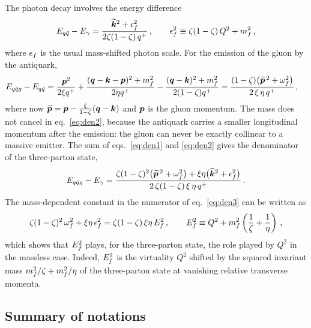 The photon decay involves the energy difference
\begin{equation}
E_{q\bar q}-E_\gamma=\frac{\widetilde{\bm{k}}^2+\epsilon_f^2}{2\zeta(1-\zeta)\,q^+}\,,\qquad
\epsilon_f^2\equiv\zeta(1-\zeta)\,Q^2+m_f^2\,,
\label{eq:den1}
\end{equation}
where $\epsilon_f$ is the usual mass-shifted photon scale. For the emission of the gluon by the antiquark,
\begin{align}
E_{q\bar q g}-E_{q\bar q}&=\frac{\bm{p}^2}{2\xi q^+}+\frac{(\bm{q}-\bm{k}-\bm{p})^2+m_f^2}{2\eta q^+}
-\frac{(\bm{q}-\bm{k})^2+m_f^2}{2(1-\zeta)q^+}
=\frac{(1-\zeta)\big(\widetilde{\bm{p}}^{\,2}+\omega_f^2\big)}{2\,\xi\,\eta\,q^+}\,,
\label{eq:den2}
\end{align}
where now $\widetilde{\bm{p}}=\bm{p}-\frac{\xi}{1-\zeta}(\bm{q}-\bm{k})$ and $\bm{p}$ is the gluon momentum. The mass does not
cancel in eq.~\eqref{eq:den2}, because the antiquark carries a smaller longitudinal momentum after the
emission: the gluon can never be exactly collinear to a massive emitter. The sum of
eqs.~\eqref{eq:den1} and \eqref{eq:den2} gives the denominator of the three-parton state,
\begin{equation}
E_{q\bar q g}-E_\gamma=\frac{\zeta(1-\zeta)^2\big(\widetilde{\bm{p}}^{\,2}+\omega_f^2\big)+\xi\eta\big(\widetilde{\bm{k}}^2+\epsilon_f^2\big)}
{2\,\zeta(1-\zeta)\,\xi\,\eta\,q^+}\,.
\label{eq:den3}
\end{equation}
The mass-dependent constant in the numerator of eq.~\eqref{eq:den3} can be written as
\begin{equation}
\zeta(1-\zeta)^2\,\omega_f^2+\xi\eta\,\epsilon_f^2=\zeta(1-\zeta)\,\xi\eta\,E_f^2\,,\qquad
E_f^2\equiv Q^2+m_f^2\left(\frac1\zeta+\frac1\eta\right)\,,
\label{eq:Ef}
\end{equation}
which shows that $E_f^2$ plays, for the three-parton state, the role played by $Q^2$ in the massless
case. Indeed, $E_f^2$ is the virtuality $Q^2$ shifted by the squared invariant mass
$m_f^2/\zeta+m_f^2/\eta$ of the three-parton state at vanishing relative transverse momenta.

\subsection{Summary of notations}
\label{sec:not}

